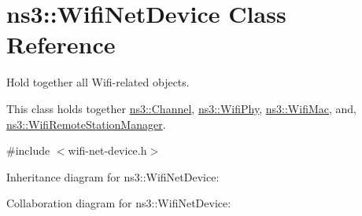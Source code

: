 \hypertarget{classns3_1_1WifiNetDevice}{}\section{ns3\+:\+:Wifi\+Net\+Device Class Reference}
\label{classns3_1_1WifiNetDevice}


Hold together all Wifi-\/related objects.

This class holds together \hyperlink{classns3_1_1Channel}{ns3\+::\+Channel}, \hyperlink{classns3_1_1WifiPhy}{ns3\+::\+Wifi\+Phy}, \hyperlink{classns3_1_1WifiMac}{ns3\+::\+Wifi\+Mac}, and, \hyperlink{classns3_1_1WifiRemoteStationManager}{ns3\+::\+Wifi\+Remote\+Station\+Manager}.  




{\ttfamily \#include $<$wifi-\/net-\/device.\+h$>$}



Inheritance diagram for ns3\+:\+:Wifi\+Net\+Device\+:


Collaboration diagram for ns3\+:\+:Wifi\+Net\+Device\+:
